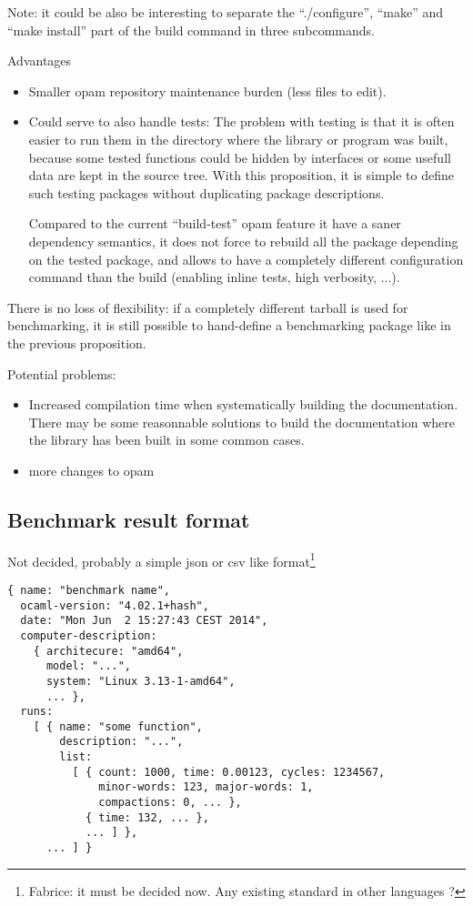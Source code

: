 \documentclass[11pt,a4paper]{article}
\begin{document}
Note: it could be also be interesting to separate the ``./configure'',
``make'' and ``make install'' part of the build command in three
subcommands.

Advantages
\begin{itemize}
\item Smaller opam repository maintenance burden (less files to edit).
\item Could serve to also handle tests: The problem with testing is
  that it is often easier to run them in the directory where the
  library or program was built, because some tested functions could be
  hidden by interfaces or some usefull data are kept in the source
  tree. With this proposition, it is simple to define such testing
  packages without duplicating package descriptions.

  Compared to the current ``build-test'' opam feature it have a saner
  dependency semantics, it does not force to rebuild all the package
  depending on the tested package, and allows to have a completely
  different configuration command than the build (enabling inline
  tests, high verbosity, ...).
\end{itemize}

There is no loss of flexibility: if a completely different tarball is
used for benchmarking, it is still possible to hand-define a
benchmarking package like in the previous proposition.

Potential problems:
\begin{itemize}
\item Increased compilation time when systematically building the
  documentation. There may be some reasonnable solutions to build the
  documentation where the library has been built in some common cases.
\item more changes to opam
\end{itemize}

\subsection{Benchmark result format}

Not decided, probably a simple json or csv like
format\footnote{Fabrice: it must be decided now. Any existing standard
  in other languages ?}

\begin{verbatim}
{ name: "benchmark name",
  ocaml-version: "4.02.1+hash",
  date: "Mon Jun  2 15:27:43 CEST 2014",
  computer-description:
    { architecure: "amd64",
      model: "...",
      system: "Linux 3.13-1-amd64",
      ... },
  runs:
    [ { name: "some function",
        description: "...",
        list:
          [ { count: 1000, time: 0.00123, cycles: 1234567,
              minor-words: 123, major-words: 1,
              compactions: 0, ... },
            { time: 132, ... },
            ... ] },
      ... ] }
\end{verbatim}
\end{document}
